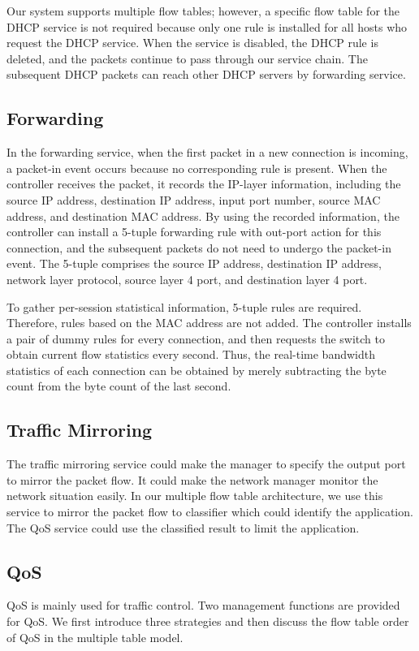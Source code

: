Our system supports multiple flow tables; however, a specific flow table for the DHCP service is not required because only one rule is installed for all hosts who request the DHCP service. When the service is disabled, the DHCP rule is deleted, and the packets continue to pass through our service chain. The subsequent DHCP packets can reach other DHCP servers by forwarding service.


\subsection{Forwarding} \label{ssec:forwarding}
In the forwarding service, when the first packet in a new connection is incoming, a packet-in event occurs because no corresponding rule is present. When the controller receives the packet, it records the IP-layer information, including the source IP address, destination IP address, input port number, source MAC address, and destination MAC address. By using the recorded information, the controller can install a 5-tuple forwarding rule with out-port action for this connection, and the subsequent packets do not need to undergo the packet-in event. The 5-tuple comprises the source IP address, destination IP address, network layer protocol, source layer 4 port, and destination layer 4 port.

To gather per-session statistical information, 5-tuple rules are required. Therefore, rules based on the MAC address are not added. The controller installs a pair of dummy rules for every connection, and then requests the switch to obtain current flow statistics every second. Thus, the real-time bandwidth statistics of each connection can be obtained by merely subtracting the byte count from the byte count of the last second.


\subsection{Traffic Mirroring} \label{ssec:mirror}
The traffic mirroring service could make the manager to specify the output port to mirror the packet flow.
It could make the network manager monitor the network situation easily.
In our multiple flow table architecture, we use this service to mirror the packet flow to classifier which could identify the application.
The QoS service could use the classified result to limit the application.


\subsection{QoS}
QoS is mainly used for traffic control. Two management functions are provided for QoS. We first introduce three strategies and then discuss the flow table order of QoS in the multiple table model.

